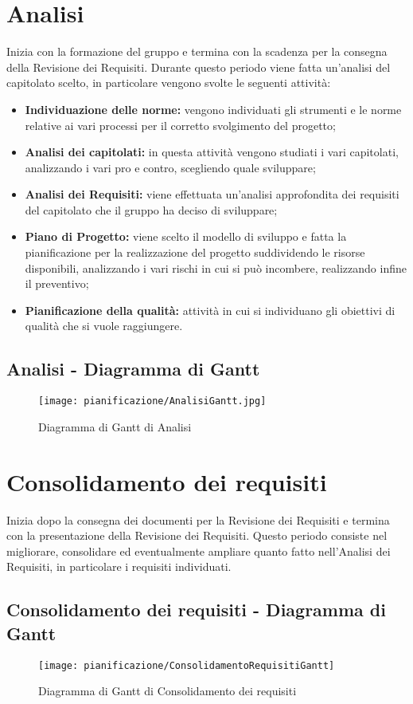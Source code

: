 \documentclass[../PianodiProgetto.tex]{subfiles}
\begin{document}
	\section{Analisi}
	Inizia con la formazione del gruppo e termina con la scadenza per la consegna della Revisione dei Requisiti.
	Durante questo periodo viene fatta un'analisi del capitolato scelto, in particolare vengono svolte le seguenti attività:
	\begin{itemize}
		\item \textbf{Individuazione delle norme:} vengono individuati gli strumenti e le norme relative ai vari processi per il corretto svolgimento del progetto;
		\item \textbf{Analisi dei capitolati:} in questa attività vengono studiati i vari capitolati, analizzando i vari pro e contro, scegliendo quale sviluppare;
		\item \textbf{Analisi dei Requisiti:} viene effettuata un'analisi approfondita dei requisiti del capitolato che il gruppo ha deciso di sviluppare;
		\item \textbf{Piano di Progetto:} viene scelto il modello di sviluppo e fatta la pianificazione per la realizzazione del progetto suddividendo le risorse disponibili, analizzando i vari rischi in cui si può incombere, realizzando infine il preventivo; 
		\item \textbf{Pianificazione della qualità:} attività in cui si individuano gli obiettivi di qualità che si vuole raggiungere.	
	\end{itemize}
	
	\subsection{Analisi - Diagramma di Gantt}
	\begin{figure}[H]
		\texttt{[image: pianificazione/AnalisiGantt.jpg]}	
		\caption{Diagramma di Gantt di Analisi}\label{fig:1}	
	\end{figure}
	\newpage
		\section{Consolidamento dei requisiti} Inizia dopo la consegna dei documenti per la Revisione dei Requisiti e termina con la presentazione della Revisione dei Requisiti. Questo periodo consiste nel migliorare, consolidare ed eventualmente ampliare quanto fatto nell'Analisi dei Requisiti, in particolare i requisiti individuati.
	\subsection{Consolidamento dei requisiti - Diagramma di Gantt}
	\begin{figure}[H]
		\texttt{[image: pianificazione/ConsolidamentoRequisitiGantt]}	
		\caption{Diagramma di Gantt di Consolidamento dei requisiti}\label{fig:2}
	\end{figure}
	\newpage
\end{document}

